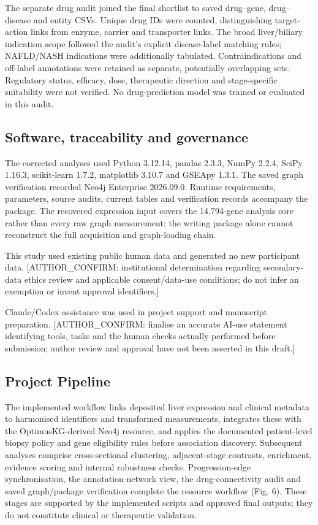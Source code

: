 \documentclass[11pt,a4paper]{article}
\begin{document}
The separate drug audit joined the final shortlist to saved drug–gene, drug–disease and entity CSVs. Unique drug IDs were counted, distinguishing target-action links from enzyme, carrier and transporter links. The broad liver/biliary indication scope followed the audit's explicit disease-label matching rules; NAFLD/NASH indications were additionally tabulated. Contraindications and off-label annotations were retained as separate, potentially overlapping sets. Regulatory status, efficacy, dose, therapeutic direction and stage-specific suitability were not verified. No drug-prediction model was trained or evaluated in this audit.

\subsection*{Software, traceability and governance}
The corrected analyses used Python 3.12.14, pandas 2.3.3, NumPy 2.2.4, SciPy 1.16.3, scikit-learn 1.7.2, matplotlib 3.10.7 and GSEApy 1.3.1. The saved graph verification recorded Neo4j Enterprise 2026.09.0. Runtime requirements, parameters, source audits, current tables and verification records accompany the package. The recovered expression input covers the 14,794-gene analysis core rather than every raw graph measurement; the writing package alone cannot reconstruct the full acquisition and graph-loading chain.

This study used existing public human data and generated no new participant data. [AUTHOR\_CONFIRM: institutional determination regarding secondary-data ethics review and applicable consent/data-use conditions; do not infer an exemption or invent approval identifiers.]

Claude/Codex assistance was used in project support and manuscript preparation. [AUTHOR\_CONFIRM: finalise an accurate AI-use statement identifying tools, tasks and the human checks actually performed before submission; author review and approval have not been asserted in this draft.]

\subsection*{Project Pipeline}
The implemented workflow links deposited liver expression and clinical metadata to harmonised identifiers and transformed measurements, integrates these with the OptimusKG-derived Neo4j resource, and applies the documented patient-level biopsy policy and gene eligibility rules before association discovery. Subsequent analyses comprise cross-sectional clustering, adjacent-stage contrasts, enrichment, evidence scoring and internal robustness checks. Progression-edge synchronisation, the annotation-network view, the drug-connectivity audit and saved graph/package verification complete the resource workflow (Fig. 6). These stages are supported by the implemented scripts and approved final outputs; they do not constitute clinical or therapeutic validation.
\end{document}

